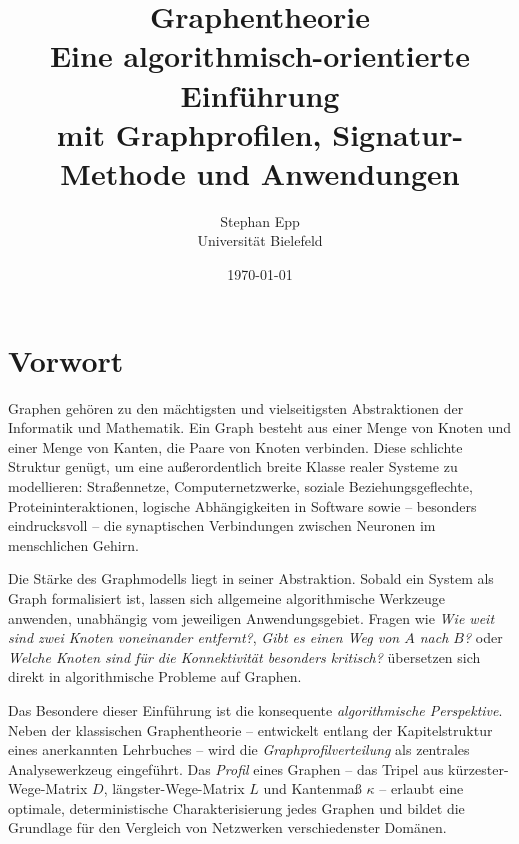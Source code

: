 ﻿\documentclass[a4paper,12pt,openany,oneside]{book}
\title{\Huge\textbf{Graphentheorie}\\[1.2ex]
  \Large Eine algorithmisch-orientierte Einf\"uhrung\\[0.8ex]
  \large mit Graphprofilen, Signatur-Methode und Anwendungen}
\author{Stephan Epp\\[0.5ex]\small Universit\"at Bielefeld}
\date{\today}
\theoremstyle{definition}
\theoremstyle{plain}
\theoremstyle{remark}
\renewcommand{\contentsname}{Inhaltsverzeichnis}%
\renewcommand{\bibname}{Literaturverzeichnis}%
\renewcommand{\chaptername}{Kapitel}%
\renewcommand{\figurename}{Abbildung}%
\renewcommand{\tablename}{Tabelle}%
\renewcommand{\listfigurename}{Abbildungsverzeichnis}%
\renewcommand{\listtablename}{Tabellenverzeichnis}%
\renewcommand{\indexname}{Stichwortverzeichnis}%
\renewcommand{\appendixname}{Anhang}%
\renewcommand{\partname}{Teil}%
\begin{document}
\renewcommand{\proofname}{Beweis}
\renewcommand{\chaptername}{Kapitel}
\renewcommand{\appendixname}{Anhang}
\renewcommand{\contentsname}{Inhaltsverzeichnis}
\renewcommand{\listfigurename}{Abbildungsverzeichnis}
\renewcommand{\listtablename}{Tabellenverzeichnis}
\renewcommand{\bibname}{Literaturverzeichnis}
\renewcommand{\indexname}{Stichwortverzeichnis}
\renewcommand{\figurename}{Abbildung}
\renewcommand{\tablename}{Tabelle}
\renewcommand{\partname}{Teil}
\renewcommand{\today}{%
  \number\day.~\ifcase\month\or
  Januar\or Februar\or M\"arz\or April\or Mai\or Juni\or
  Juli\or August\or September\or Oktober\or November\or Dezember%
  \fi\space\number\year}
\frontmatter
\maketitle
\clearpage

\renewcommand{\contentsname}{Inhaltsverzeichnis}
\tableofcontents
\clearpage
\chapter*{Vorwort}

Graphen geh\"oren zu den m\"achtigsten und vielseitigsten Abstraktionen
der Informatik und Mathematik. Ein Graph besteht aus einer Menge von
Knoten und einer Menge von Kanten, die Paare von Knoten verbinden.
Diese schlichte Struktur gen\"ugt, um eine au\ss{}erordentlich breite
Klasse realer Systeme zu modellieren: Stra\ss{}ennetze, Computernetzwerke,
soziale Beziehungsgeflechte, Proteininteraktionen, logische Abh\"angigkeiten
in Software sowie -- besonders eindrucksvoll -- die synaptischen Verbindungen
zwischen Neuronen im menschlichen Gehirn.

Die St\"arke des Graphmodells liegt in seiner Abstraktion. Sobald ein
System als Graph formalisiert ist, lassen sich allgemeine algorithmische
Werkzeuge anwenden, unabh\"angig vom jeweiligen Anwendungsgebiet. Fragen
wie \emph{Wie weit sind zwei Knoten voneinander entfernt?}, \emph{Gibt es
einen Weg von $A$ nach $B$?} oder \emph{Welche Knoten sind f\"ur die
Konnektivit\"at besonders kritisch?} \"ubersetzen sich direkt in
algorithmische Probleme auf Graphen.

Das Besondere dieser Einf\"uhrung ist die konsequente \emph{algorithmische
Perspektive}. Neben der klassischen Graphentheorie -- entwickelt entlang
der Kapitelstruktur eines anerkannten Lehrbuches -- wird die
\emph{Graphprofilverteilung} als zentrales Analysewerkzeug eingef\"uhrt.
Das \emph{Profil} eines Graphen -- das Tripel aus k\"urzester-Wege-Matrix
$D$, l\"angster-Wege-Matrix $L$ und Kantenma\ss{} $\kappa$ -- erlaubt eine
optimale, deterministische Charakterisierung jedes Graphen und bildet die
Grundlage f\"ur den Vergleich von Netzwerken verschiedenster Dom\"anen.
\end{document}
